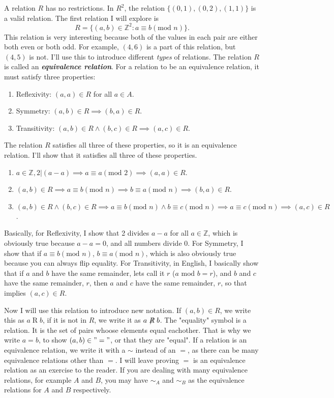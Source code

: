\documentclass{report}
\newcommand{\bZ}{\mathbb{Z}}
\begin{document}
A relation $R$ has no restrictions. In $R^2$, the relation $\{(0,1), (0,2), (1, 1)\}$ is a valid relation.
The first relation I will explore is $$R = \{(a, b) \in \mathbb{Z}^2 : a \equiv b (\text{mod } n)\}.$$
This relation is very interesting because both of the values in each pair are either both even or both odd.
For example, $(4,6)$ is a part of this relation, but $(4, 5)$ is not. 
I'll use this to introduce different \textit{types} of relations. The relation $R$ is called an \textbf{\textit{equivalence relation}}.
For a relation to be an equivalence relation, it must satisfy three properties:
\begin{enumerate}
    \item Reflexivity: $(a, a) \in R$ for all $a \in A$.
    \item Symmetry: $(a, b) \in R \implies (b, a) \in R$.
    \item Transitivity: $(a, b) \in R \land (b, c) \in R \implies (a, c) \in R$.
\end{enumerate}
The relation $R$ satisfies all three of these properties, so it is an equivalence relation.
I'll show that it satisfies all three of these properties.
\begin{enumerate}
    \item $a \in \bZ, 2 | (a-a) \implies a \equiv a (\text{mod } 2) \implies (a,a) \in R$.
    \item $(a, b) \in R \implies a \equiv b (\text{mod } n) \implies b \equiv a (\text{mod } n) \implies (b, a) \in R$.
    \item $(a, b) \in R \land (b, c) \in R \implies a \equiv b (\text{mod } n) \land b \equiv c (\text{mod } n) \implies a \equiv c (\text{mod } n) \implies (a, c) \in R$.
\end{enumerate}
Basically, for Reflexivity, I show that 2 divides $a-a$ for all $a \in \bZ$, which is obviously true because $a-a = 0$, and all numbers divide 0. 
For Symmetry, I show that if $a \equiv b (\text{mod } n)$, $b \equiv a (\text{mod } n)$, which is also obviously true because you can always flip equality.
For Transitivity, in English, I basically show that if $a$ and $b$ have the same remainder, lets call it $r$ ($a \text{ mod } b = r$), and $b$ and $c$ have the same remainder, $r$, then $a$ and $c$ have the same remainder, $r$, so that implies $(a, c) \in R$.

Now I will use this relation to introduce new notation. If $(a, b) \in R$, we write this as $a \mathrel R b$, if it is not in $R$, we write it as $a \not \mathrel R b$.
The "equality" symbol is a relation. It is the set of pairs whoose elements equal eachother.
That is why we write $a = b$, to show $(a,b) \in "="$, or that they are "equal".
If a relation is an equivalence relation, we write it with a $\sim$ instead of an $=$, as there can be many equivalence relations other than $=$.
I will leave proving $=$ is an equivalence relation as an exercise to the reader.
If you are dealing with many equivalence relations, for example $A$ and $B$, you may have $\sim_A$ and $\sim_B$ as the equivalence relations for $A$ and $B$ respectively.
\end{document}
